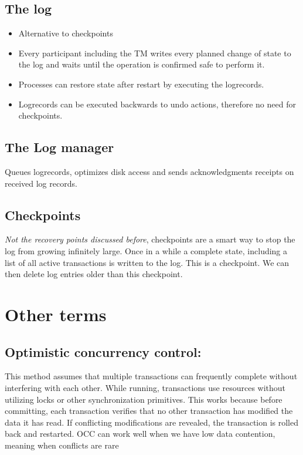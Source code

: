 \subsection{The log}
\begin{itemize}
\item Alternative to checkpoints
\item Every participant including the TM writes every planned change of state to the log and waits until the operation is confirmed safe to perform it. 
\item Processes can restore state after restart by executing the logrecords.
\item Logrecords can be executed backwards to undo actions, therefore no need for checkpoints.
\end{itemize}

\subsection{The Log manager}
Queues logrecords, optimizes disk access and sends acknowledgments receipts on received log records.

\subsection{Checkpoints}
\textit{Not the recovery points discussed before}, checkpoints are a smart way to stop the log from growing infinitely large. Once in a while a complete state, including a list of all active transactions is written to the log. This is a checkpoint. We can then delete log entries older than this checkpoint.

\section{Other terms}
\subsection{Optimistic concurrency control:}
This method assumes that multiple transactions can frequently complete without interfering with each other. While running, transactions use resources without utilizing locks or other synchronization primitives. This works because before committing, each transaction verifies that no other transaction has modified the data it has read. If conflicting modifications are revealed, the transaction is rolled back and restarted. OCC can work well when we have low data contention, meaning when conflicts are rare


